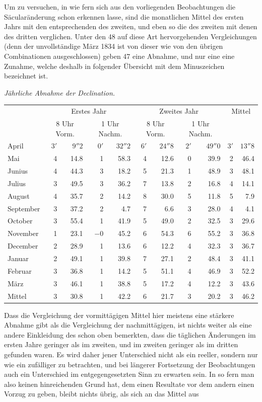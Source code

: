 Um zu versuchen, in wie fern sich aus den vorliegenden Beobachtungen die Säcularänderung schon erkennen lasse, sind die monatlichen Mittel des ersten Jahrs mit den entsprechenden des zweiten, und eben so die des zweiten mit denen des dritten verglichen. Unter den 48 auf diese Art hervorgehenden Vergleichungen (denn der unvollständige März 1834 ist von dieser wie von den übrigen Combinationen ausgeschlossen) geben 47 eine Abnahme, und nur eine eine Zunahme, welche deshalb in folgender Übersicht mit dem Minuszeichen bezeichnet ist.
\begin{center}\small\setlength{\tabcolsep}{3pt}
\textit{Jährliche Abnahme der Declination.}\par\smallskip
\begin{tabular}{l||rr|rr||rr|rr||rr}
&\multicolumn{4}{c||}{Erstes Jahr}&\multicolumn{4}{c||}{Zweites Jahr}&\multicolumn{2}{c}{Mittel}\\
&\multicolumn{2}{c|}{8 Uhr Vorm.}&\multicolumn{2}{c||}{1 Uhr Nachm.}&\multicolumn{2}{c|}{8 Uhr Vorm.}&\multicolumn{2}{c||}{1 Uhr Nachm.}&&\\\hline\hline
April&$3'$&$9''2$&$0'$&$32''2$&$6'$&$24''8$&$2'$&$49''0$&$3'$&$13''8$\\
Mai&4&14.8&1&58.3&4&12.6&0&39.9&2&46.4\\
Junius&4&44.3&3&18.2&5&21.3&1&48.9&3&48.1\\
Julius&3&49.5&3&36.2&7&13.8&2&16.8&4&14.1\\
August&4&35.7&2&14.2&8&30.0&5&11.8&5&7.9\\
September&3&37.2&2&4.7&7&6.6&3&28.0&4&4.1\\
October&3&55.4&1&41.9&5&49.0&2&32.5&3&29.6\\
November&1&23.1&$-0$&45.2&6&54.3&6&55.2&3&36.8\\
December&2&28.9&1&13.6&6&12.2&4&32.3&3&36.7\\
Januar&2&49.1&1&39.8&7&27.1&2&48.4&3&41.1\\
Februar&3&36.8&1&14.2&5&51.1&4&46.9&3&52.2\\
März&3&46.1&1&38.8&5&17.2&4&12.2&3&43.6\\\hline\hline
Mittel&3&30.8&1&42.2&6&21.7&3&20.2&3&46.2
\end{tabular}
\end{center}
Dass die Vergleichung der vormittägigen Mittel hier meistens eine stärkere Abnahme gibt als die Vergleichung der nachmittägigen, ist nichts weiter als eine andere Einkleidung des schon oben bemerkten, dass die täglichen Änderungen im ersten Jahre geringer als im zweiten, und im zweiten geringer als im dritten gefunden waren. Es wird daher jener Unterschied nicht als ein reeller, sondern nur wie ein zufälliger zu betrachten, und bei längerer Fortsetzung der Beobachtungen auch ein Unterschied im entgegengesetzten Sinn zu erwarten sein. In so fern man also keinen hinreichenden Grund hat, dem einen Resultate vor dem andern einen Vorzug zu geben, bleibt nichts übrig, als sich an das Mittel aus
